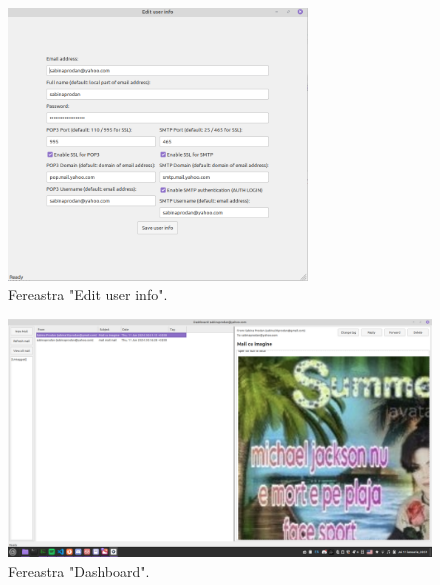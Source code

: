 \documentclass[runningheads]{llncs}
\begin{document}
\begin{figure}
    \centering
    \includegraphics[width={300px}]{editUserInfo.png}
    \caption{Fereastra "Edit user info".}
    \label{fig:editUserInfo}
\end{figure}

\begin{figure}
    \centering
    \includegraphics[width=\textwidth]{dashboard.png}
    \caption{Fereastra "Dashboard".}
    \label{fig:dashboard}
\end{figure}
\end{document}
